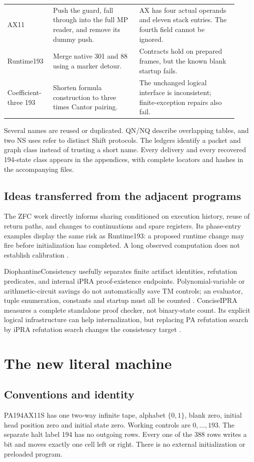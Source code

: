 \documentclass[11pt,letterpaper]{article}
\begin{document}
\begin{longtable}{@{}p{0.18\linewidth}p{0.35\linewidth}p{0.40\linewidth}@{}}
AX11 & Push the guard, fall through into the full MP reader, and remove its dummy push. & AX has four actual operands and eleven stack entries. The fourth field cannot be ignored.\\
Runtime193 & Merge native 301 and 88 using a marker detour. & Contracts hold on prepared frames, but the known blank startup fails.\\
Coefficient-three 193 & Shorten formula construction to three times Cantor pairing. & The unchanged logical interface is inconsistent; finite-exception repairs also fail.\\
\bottomrule\end{longtable}

Several names are reused or duplicated. QN/NQ describe overlapping
tables, and two NS uses refer to distinct Shift protocols. The ledgers
identify a packet and graph class instead of trusting a short name.
Every delivery and every recovered 194-state class appears in the
appendices, with complete locators and hashes in the accompanying files.

\subsection{Ideas transferred from the adjacent programs}
The ZFC work directly informs sharing conditioned on execution history,
reuse of return paths, and changes to continuations and spare registers. Its
phase-entry examples display the same risk as Runtime193: a proposed
runtime change may fire before initialization has completed. A long
observed computation does not establish calibration
\cite{zfc-phase,zfc-allocation}.

DiophantineConsistency usefully separates finite artifact identities,
refutation predicates, and internal iPRA proof-existence endpoints.
Polynomial-variable or arithmetic-circuit savings do not automatically
save TM controls; an evaluator, tuple enumeration, constants and startup
must all be counted \cite{diophantine}. ConciseIPRA measures a complete
standalone proof checker, not binary-state count. Its explicit logical
infrastructure can help internalization, but replacing PA refutation
search by iPRA refutation search changes the consistency target
\cite{concise}.

\section{The new literal machine}
\subsection{Conventions and identity}
PA194AX11S has one two-way infinite tape, alphabet $\{0,1\}$, blank zero,
initial head position zero and initial state zero. Working controls are
$0,\ldots,193$. The separate halt label 194 has no outgoing rows. Every
one of the 388 rows writes a bit and moves exactly one cell left or right.
There is no external initialization or preloaded program.
\end{document}
